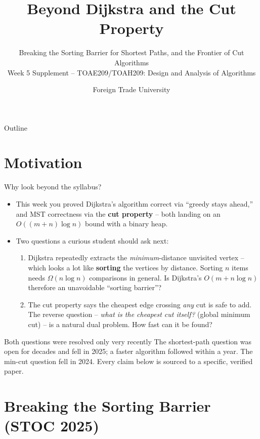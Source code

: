 \documentclass[11pt,aspectratio=169]{beamer}
\title{Beyond Dijkstra and the Cut Property}
\subtitle{Breaking the Sorting Barrier for Shortest Paths, and the Frontier of Cut Algorithms\\
\small Week 5 Supplement -- TOAE209/TOAH209: Design and Analysis of Algorithms}
\author{Foreign Trade University}
\date{}
\begin{document}
\begin{frame}
  \titlepage
\end{frame}

\begin{frame}{Outline}
  \tableofcontents
\end{frame}

\section{Motivation}

\begin{frame}{Why look beyond the syllabus?}
  \begin{itemize}
    \item This week you proved Dijkstra's algorithm correct via ``greedy stays
    ahead,'' and MST correctness via the \textbf{cut property} -- both landing on
    an $O((m+n)\log n)$ bound with a binary heap.
    \item Two questions a curious student should ask next:
    \begin{enumerate}
      \item Dijkstra repeatedly extracts the \emph{minimum}-distance unvisited
      vertex -- which looks a lot like \textbf{sorting} the vertices by distance.
      Sorting $n$ items needs $\Omega(n\log n)$ comparisons in general. Is
      Dijkstra's $O(m+n\log n)$ therefore an unavoidable ``sorting barrier''?
      \item The cut property says the cheapest edge crossing \emph{any} cut is
      safe to add. The reverse question -- \emph{what is the cheapest cut
      itself?} (global minimum cut) -- is a natural dual problem. How fast can
      it be found?
    \end{enumerate}
  \end{itemize}
  \begin{alertblock}{Both questions were resolved only very recently}
    The shortest-path question was open for decades and fell in 2025; a faster
    algorithm followed within a year. The min-cut question fell in 2024. Every
    claim below is sourced to a specific, verified paper.
  \end{alertblock}
\end{frame}

\section{Breaking the Sorting Barrier (STOC 2025)}
\end{document}
